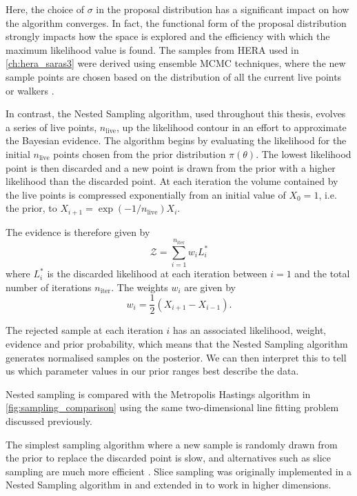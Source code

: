 Here, the choice of $\sigma$ in the proposal distribution has a significant impact on how the algorithm converges. In fact, the functional form of the proposal distribution strongly impacts how the space is explored and the efficiency with which the maximum likelihood value is found. The samples from HERA used in \cref{ch:hera_saras3} were derived using ensemble MCMC techniques, where the new sample points are chosen based on the distribution of all the current live points or walkers \cite{Foreman_Mackey_2013, Ashton_ns_review_2022}.

In contrast, the Nested Sampling algorithm, used throughout this thesis, evolves a series of live points, $n_{\mathrm{live}}$, up the likelihood contour \cite{skilling_nested_2004, Ashton_ns_review_2022} in an effort to approximate the Bayesian evidence. The algorithm begins by evaluating the likelihood for the initial $n_{\mathrm{live}}$ points chosen from the prior distribution $\pi(\theta)$. The lowest likelihood point is then discarded and a new point is drawn from the prior with a higher likelihood than the discarded point. At each iteration the volume contained by the live points is compressed exponentially from an initial value of $X_0 = 1$, i.e. the prior, to $X_{i+1} = \exp(-1/n_\mathrm{live}) X_{i}$.%

The evidence is therefore given by
\begin{equation}
    \mathcal{Z} = \sum^{n_\mathrm{iter}}_{i=1} w_i L^*_i
\end{equation}
where $L^*_i$ is the discarded likelihood at each iteration between $i=1$ and the total number of iterations $n_\mathrm{iter}$. The weights $w_i$ are given by
\begin{equation}
    w_i = \frac{1}{2}(X_{i+1} - X_{i-1}).
\end{equation}

The rejected sample at each iteration $i$ has an associated likelihood, weight, evidence and prior probability, which means that the Nested Sampling algorithm generates normalised samples on the posterior. We can then interpret this to tell us which parameter values in our prior ranges best describe the data.

Nested sampling is compared with the Metropolis Hastings algorithm in \cref{fig:sampling_comparison} using the same two-dimensional line fitting problem discussed previously.

The simplest sampling algorithm where a new sample is randomly drawn from the prior to replace the discarded point is slow, and alternatives such as slice sampling are much more efficient \cite{Neal_sampling_2000}. Slice sampling was originally implemented in a Nested Sampling algorithm in \cite{Aitken_sampling_2013} and extended in \cite{Handley2015a, Handley2015b} to work in higher dimensions. 

